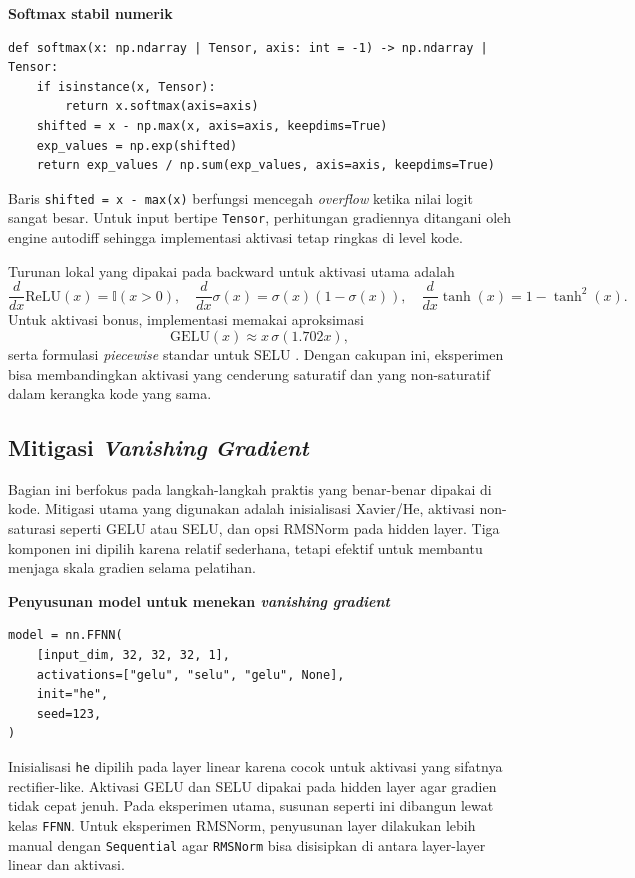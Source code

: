 \documentclass{article}
\begin{document}
\noindent\textbf{Softmax stabil numerik}\par
\begin{lstlisting}
def softmax(x: np.ndarray | Tensor, axis: int = -1) -> np.ndarray | Tensor:
    if isinstance(x, Tensor):
        return x.softmax(axis=axis)
    shifted = x - np.max(x, axis=axis, keepdims=True)
    exp_values = np.exp(shifted)
    return exp_values / np.sum(exp_values, axis=axis, keepdims=True)
\end{lstlisting}
Baris \texttt{shifted = x - max(x)} berfungsi mencegah \textit{overflow} ketika nilai logit sangat besar. Untuk input bertipe \texttt{Tensor}, perhitungan gradiennya ditangani oleh engine autodiff sehingga implementasi aktivasi tetap ringkas di level kode.

Turunan lokal yang dipakai pada backward untuk aktivasi utama adalah
\begin{equation}
\frac{d}{dx}\mathrm{ReLU}(x)=\mathbb{I}(x>0),\quad
\frac{d}{dx}\sigma(x)=\sigma(x)(1-\sigma(x)),\quad
\frac{d}{dx}\tanh(x)=1-\tanh^2(x).
\end{equation}
Untuk aktivasi bonus, implementasi memakai aproksimasi
\begin{equation}
\mathrm{GELU}(x)\approx x\,\sigma(1.702x),
\end{equation}
serta formulasi \textit{piecewise} standar untuk SELU \citep{hendrycks2016gelu,klambauer2017selfnormalizing}. Dengan cakupan ini, eksperimen bisa membandingkan aktivasi yang cenderung saturatif dan yang non-saturatif dalam kerangka kode yang sama.

\subsection{Mitigasi \textit{Vanishing Gradient}}
\label{subsec:vanishing}
Bagian ini berfokus pada langkah-langkah praktis yang benar-benar dipakai di kode. Mitigasi utama yang digunakan adalah inisialisasi Xavier/He, aktivasi non-saturasi seperti GELU atau SELU, dan opsi RMSNorm pada hidden layer. Tiga komponen ini dipilih karena relatif sederhana, tetapi efektif untuk membantu menjaga skala gradien selama pelatihan.

\noindent\textbf{Penyusunan model untuk menekan \textit{vanishing gradient}}\par
\begin{lstlisting}
model = nn.FFNN(
    [input_dim, 32, 32, 32, 1],
    activations=["gelu", "selu", "gelu", None],
    init="he",
    seed=123,
)
\end{lstlisting}
Inisialisasi \texttt{he} dipilih pada layer linear karena cocok untuk aktivasi yang sifatnya rectifier-like. Aktivasi GELU dan SELU dipakai pada hidden layer agar gradien tidak cepat jenuh. Pada eksperimen utama, susunan seperti ini dibangun lewat kelas \texttt{FFNN}. Untuk eksperimen RMSNorm, penyusunan layer dilakukan lebih manual dengan \texttt{Sequential} agar \texttt{RMSNorm} bisa disisipkan di antara layer-layer linear dan aktivasi.
\end{document}
